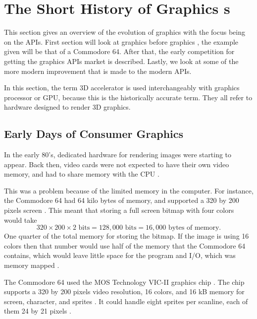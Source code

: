 \section{The Short History of Graphics s}\label{sec:short_history}
\begin{sectionmeta}
	This section gives an overview of the evolution of graphics with the focus being on the \glspl{API}.
	First section will look at graphics before graphics , the example given will be that of a Commodore 64.
	After that, the early competition for getting the graphics \glspl{API} market is described.
	Lastly, we look at some of the more modern improvement that is made to the modern \glspl{API}.
	
	In this section, the term 3D accelerator is used interchangeably with graphics processor or \gls{GPU}, because this is the historically accurate term. 
	They all refer to hardware designed to render 3D graphics.
\end{sectionmeta}

\subsection{Early Days of Consumer Graphics}

In the early 80's, dedicated hardware for rendering images were starting to appear.
Back then, video cards were not expected to have their own video memory, and had to share memory with the \gls{CPU} \cite{wikipedia????shared}.

This was a problem because of the limited memory in the computer.
For instance, the Commodore 64 had 64 kilo bytes of memory, and supported a 320 by 200 pixels screen \cite{commodore1983commodore}.
This meant that storing a full screen bitmap with four colors would take $$320\times 200\times 2 \text{ bits} = 128,000 \text{ bits} = 16,000 \text{ bytes of memory.}$$
One quarter of the total memory for storing the bitmap.
If the image is using 16 colors then that number would use half of the memory that the Commodore 64 contains, which would leave little space for the program and I/O, which was memory mapped \cite{commodore1983commodore}.

The Commodore 64 used the MOS Technology VIC-II graphics chip \cite{commodore1983commodore}.
The chip supports a 320 by 200 pixels video resolution, 16 colors, and 16 kB memory for screen, character, and sprites \cite{commodore1983commodore}.
It could handle eight sprites per scanline, each of them 24 by 21 pixels \cite{commodore1983commodore}.

